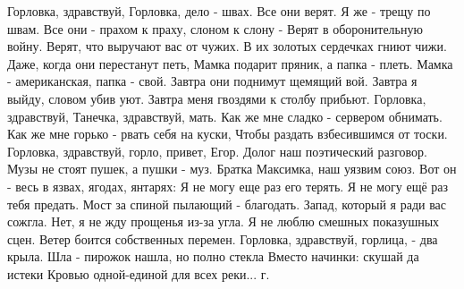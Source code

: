 \begin{multicols}{2}
\obeycr
Горловка, здравствуй, Горловка, дело - швах.
Все они верят. Я же - трещу по швам.
Все они - прахом к праху, слоном к слону -
Верят в оборонительную войну.
\smallskip
Верят, что выручают вас от чужих.
В их золотых сердечках гниют чижи.
Даже, когда они перестанут петь,
Мамка подарит пряник, а папка - плеть.
Мамка - американская, папка - свой.
\smallskip
Завтра они поднимут щемящий вой.
Завтра я выйду, словом убив уют.
Завтра меня гвоздями к столбу прибьют.
\smallskip
Горловка, здравствуй, Танечка, здравствуй, мать. 
Как же мне сладко - сервером обнимать.
Как же мне горько - рвать себя на куски,
Чтобы раздать взбесившимся от тоски.
\smallskip
Горловка, здравствуй, горло, привет, Егор.
Долог наш поэтический разговор.
Музы не стоят пушек, а пушки - муз.
Братка Максимка, наш уязвим союз.
\smallskip
Вот он - весь в язвах, ягодах, янтарях:
Я не могу еще раз его терять.
Я не могу ещё раз тебя предать.
Мост за спиной пылающий - благодать.
Запад, который я ради вас сожгла.
\smallskip
Нет, я не жду прощенья из-за угла.
Я не люблю смешных показушных сцен.
Ветер боится собственных перемен.
Горловка, здравствуй, горлица, - два крыла.
\smallskip
Шла - пирожок нашла, но полно стекла
Вместо начинки: скушай да истеки
Кровью одной-единой для всех реки...
 г.
\restorecr
\end{multicols}


